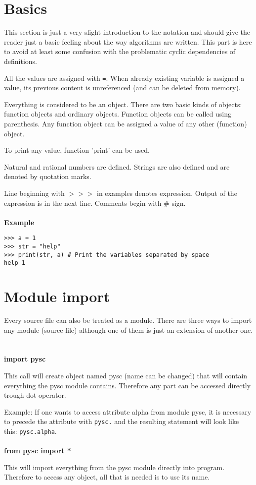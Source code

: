 \documentclass[11pt,oneside]{fithesis2}
\newcommand{\markit}[1]{\ \\\\{\noindent\textbf{#1}}}
\newcommand{\T}[1]{\texttt{#1}}
\begin{document}
\section{Basics}
This section is just a very slight introduction to the notation and should give the reader just a basic feeling about the way algorithms are written. This part is here to avoid at least some confusion with the problematic cyclic dependencies of definitions.

All the values are assigned with \T{=}. When already existing variable is assigned a value, its previous content is unreferenced (and can be deleted from memory).

Everything is considered to be an object. There are two basic kinds of objects: function objects and ordinary objects. Function objects can be called using parenthesis. Any function object can be assigned a value of any other (function) object.

To print any value, function 'print' can be used.

Natural and rational numbers are defined. Strings are also defined and are denoted by quotation marks.

Line beginning with $>>>$ in examples denotes expression. Output of the expression is in the next line. Comments begin with \# sign.
\markit{Example}
\begin{lstlisting}
>>> a = 1
>>> str = "help"
>>> print(str, a) # Print the variables separated by space
help 1
\end{lstlisting}

\section{Module import}
Every source file can also be treated as a module. There are three ways to import any module (source file) although one of them is just an extension of another one.
\markit{import pysc}

This call will create object named pysc (name can be changed) that will contain everything the pysc module contains. Therefore any part can be accessed directly trough dot operator.

Example: If one wants to access attribute alpha from module pysc, it is necessary to precede the attribute with \T{pysc.} and the resulting statement will look like this: \T{pysc.alpha}.
\markit{from pysc import *}

This will import everything from the pysc module directly into program. Therefore to access any object, all that is needed is to use its name.
\end{document}
